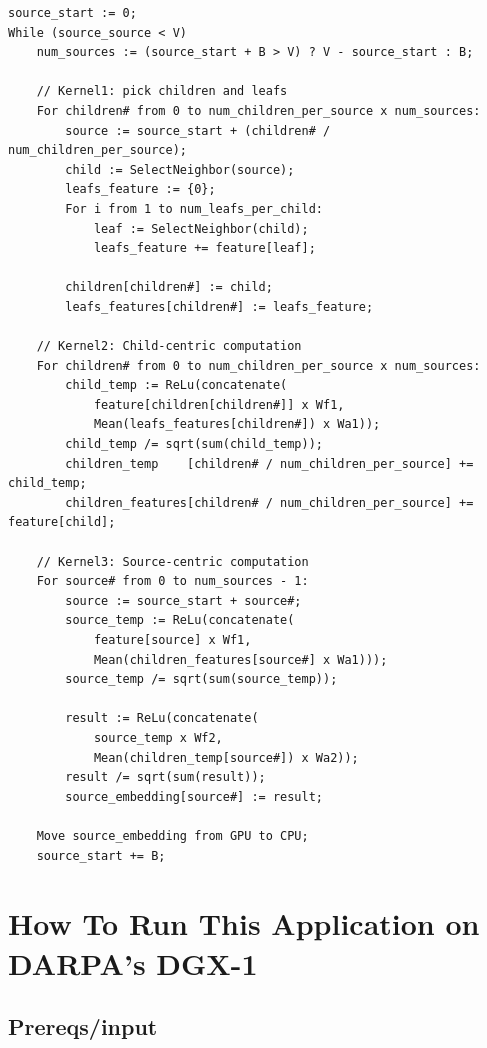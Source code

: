 \documentclass[10pt,oneside]{memoir}
\begin{document}
\begin{verbatim}
source_start := 0;
While (source_source < V)
    num_sources := (source_start + B > V) ? V - source_start : B;

    // Kernel1: pick children and leafs
    For children# from 0 to num_children_per_source x num_sources:
        source := source_start + (children# / num_children_per_source);
        child := SelectNeighbor(source);
        leafs_feature := {0};
        For i from 1 to num_leafs_per_child:
            leaf := SelectNeighbor(child);
            leafs_feature += feature[leaf];

        children[children#] := child;
        leafs_features[children#] := leafs_feature;

    // Kernel2: Child-centric computation
    For children# from 0 to num_children_per_source x num_sources:
        child_temp := ReLu(concatenate(
            feature[children[children#]] x Wf1,
            Mean(leafs_features[children#]) x Wa1));
        child_temp /= sqrt(sum(child_temp));
        children_temp    [children# / num_children_per_source] += child_temp;
        children_features[children# / num_children_per_source] += feature[child];

    // Kernel3: Source-centric computation
    For source# from 0 to num_sources - 1:
        source := source_start + source#;
        source_temp := ReLu(concatenate(
            feature[source] x Wf1,
            Mean(children_features[source#] x Wa1)));
        source_temp /= sqrt(sum(source_temp));

        result := ReLu(concatenate(
            source_temp x Wf2,
            Mean(children_temp[source#]) x Wa2));
        result /= sqrt(sum(result));
        source_embedding[source#] := result;

    Move source_embedding from GPU to CPU;
    source_start += B;
\end{verbatim}

\hypertarget{how-to-run-this-application-on-darpas-dgx-1-2}{%
\section{How To Run This Application on DARPA's
DGX-1}\label{how-to-run-this-application-on-darpas-dgx-1-2}}

\hypertarget{prereqsinput-1}{%
\subsection{Prereqs/input}\label{prereqsinput-1}}
\end{document}
